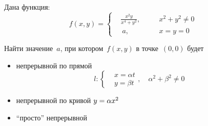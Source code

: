 \documentclass[a4paper,12pt]{article}
\begin{document}
  Дана функция:
  \[
    f(x, y) = \left\{
      \begin{aligned}
        &\frac{x^2 y}{x^4 + y^2},\quad & &x^2 + y^2 \not= 0\\
        &\ a,\quad & &x = y = 0
      \end{aligned}
    \right.
  \]

  Найти значение~$a$, при котором~$f(x, y)$ в точке~$(0, 0)$ будет
  \begin{itemize}
    \item непрерывной по прямой
    \[
      l\colon \left\{
        \begin{aligned}
          &x = \alpha t\\
          &y = \beta t
        \end{aligned}
      \right.,\quad \alpha^2 + \beta^2 \not= 0
    \]
    
    \item непрерывной по кривой $y \hm= \alpha x^2$

    \item ``просто'' непрерывной
  \end{itemize}
  
\end{document}
